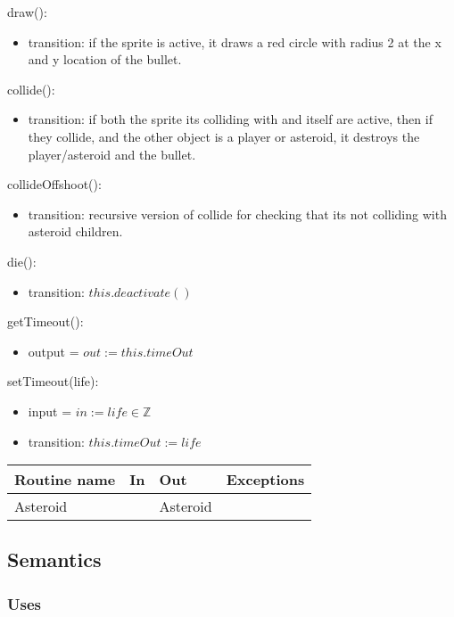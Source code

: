 \documentclass[12pt]{article}
\begin{document}
draw():
\begin{itemize}
    \item transition: if the sprite is active, it draws a red circle with radius 2 at the x and y location of the bullet.
\end{itemize}

collide():
\begin{itemize}
    \item transition: if both the sprite its colliding with and itself are active, then if they collide, and the other object is a player or asteroid, it destroys the player/asteroid and the bullet.
\end{itemize}

collideOffshoot():
\begin{itemize}
    \item transition: recursive version of collide for checking that its not colliding with asteroid children.
\end{itemize}

die():
\begin{itemize}
    \item transition: $this.deactivate()$
\end{itemize}
getTimeout():
\begin{itemize}
    \item output = $out := this.timeOut$
\end{itemize}

setTimeout(life):
\begin{itemize}
    \item input = $in := life \in \mathbb{Z}$
    \item transition: $this.timeOut := life$
\end{itemize}

\newpage

\begin{tabular}{| l | l | l | l |}
    \hline
    \textbf{Routine name} & \textbf{In} & \textbf{Out} & \textbf{Exceptions}\\
    \hline
    Asteroid & ~ & Asteroid & ~\\
    \hline
\end{tabular}

\subsection* {Semantics}

\subsubsection* {Uses}
\end{document}
